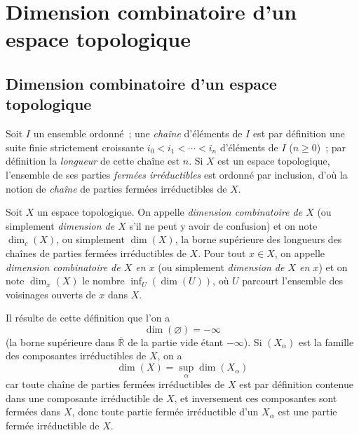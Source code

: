 \setcounter{section}{13}
\section{Dimension combinatoire d'un espace topologique}
\label{section:0.14-fr}

\setcounter{subsection}{0}
\subsection{Dimension combinatoire d'un espace topologique}
\label{subsection:0.14.1-fr}

\begin{env}[14.1.1]
\label{0.14.1.1-fr}
Soit $I$ un ensemble ordonné~; une \emph{chaîne} d'éléments de $I$ est par
définition une suite finie strictement croissante
$i_0<i_1<\cdots<i_n$ d'éléments de $I$ ($n\geq 0$)~; par définition la
\emph{longueur} de cette chaîne est $n$. Si $X$ est un espace topologique,
l'ensemble de ses parties \emph{fermées irréductibles} est ordonné par
inclusion, d'où la notion de \emph{chaîne} de parties fermées irréductibles de
$X$.
\end{env}

\begin{definition}[14.1.2]
\label{0.14.1.2-fr}
Soit $X$ un espace topologique. On appelle \emph{dimension combinatoire de
$X$} (ou simplement \emph{dimension de $X$} s'il ne peut y avoir de
confusion) et on note $\dim_c(X)$, ou simplement $\dim(X)$, la borne
supérieure des longueurs des chaînes de parties fermées irréductibles de $X$.
Pour tout $x\in X$, on appelle \emph{dimension combinatoire de $X$ en $x$}
(ou simplement \emph{dimension de $X$ en $x$}) et on note $\dim_x(X)$ le
nombre $\inf_U(\dim(U))$, où $U$ parcourt l'ensemble des voisinages ouverts de
$x$ dans $X$.
\end{definition}

Il résulte de cette définition que l'on a
\[
  \dim(\varnothing)=-\infty
\]
(la borne supérieure dans $\overline{\mathbb R}$ de la partie vide étant
$-\infty$). Si $(X_\alpha)$ est la famille des composantes irréductibles de
$X$, on a
\[
  \dim(X)=\sup_\alpha\dim(X_\alpha)
  \tag{14.1.2.1}\label{0.14.1.2.1-fr}
\]
car toute chaîne de parties fermées irréductibles de $X$ est par définition
contenue dans une composante irréductible de $X$, et inversement ces
composantes sont fermées dans $X$, donc toute partie fermée irréductible d'un
$X_\alpha$ est une partie fermée irréductible de $X$.

